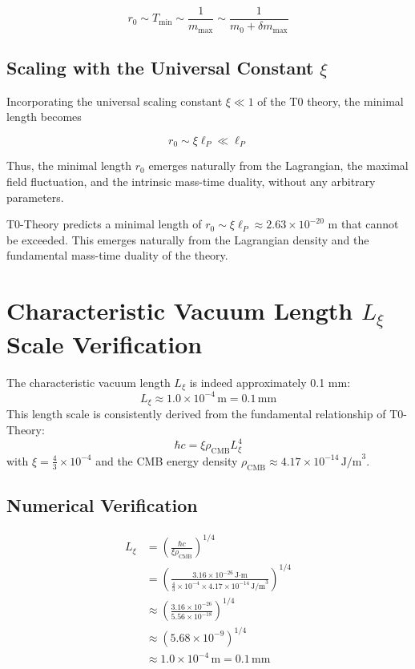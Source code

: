 \documentclass[12pt,a4paper]{article}
\numberwithin{equation}{section}
\begin{document}
	\begin{equation}
		r_0 \sim T_{\mathrm{min}} \sim \frac{1}{m_{\mathrm{max}}} \sim \frac{1}{m_0 + \delta m_{\mathrm{max}}}
	\end{equation}
	
	\subsection{Scaling with the Universal Constant $\xi$}
	
	Incorporating the universal scaling constant $\xi \ll 1$ of the T0 theory, the minimal length becomes
	
	\begin{equation}
		r_0 \sim \xi \ell_P \ll \ell_P
	\end{equation}
	
	Thus, the minimal length $r_0$ emerges naturally from the Lagrangian, the maximal field fluctuation, and the intrinsic mass-time duality, without any arbitrary parameters.
\begin{revolutionary}
	T0-Theory predicts a minimal length of $r_0 \sim \xi \ell_P \approx 2.63 \times 10^{-20}$ m that cannot be exceeded. This emerges naturally from the Lagrangian density and the fundamental mass-time duality of the theory.
\end{revolutionary}
	\section*{Characteristic Vacuum Length $L_\xi$ Scale Verification}
	
	\begin{important}
		The characteristic vacuum length $L_\xi$ is indeed approximately 0.1 mm:
		\[
		L_\xi \approx 1.0 \times 10^{-4}\,\text{m} = 0.1\,\text{mm}
		\]
		This length scale is consistently derived from the fundamental relationship of T0-Theory:
		\[
		\hbar c = \xi \rho_{\text{CMB}} L_\xi^4
		\]
		with $\xi = \frac{4}{3} \times 10^{-4}$ and the CMB energy density $\rho_{\text{CMB}} \approx 4.17 \times 10^{-14}\,\text{J/m}^3$.
	\end{important}
	
	\subsection*{Numerical Verification}
	
	\begin{align*}
		L_\xi &= \left(\frac{\hbar c}{\xi \rho_{\text{CMB}}}\right)^{1/4} \\
		&= \left(\frac{3.16 \times 10^{-26}\,\text{J·m}}{\frac{4}{3} \times 10^{-4} \times 4.17 \times 10^{-14}\,\text{J/m}^3}\right)^{1/4} \\
		&\approx \left(\frac{3.16 \times 10^{-26}}{5.56 \times 10^{-18}}\right)^{1/4} \\
		&\approx \left(5.68 \times 10^{-9}\right)^{1/4} \\
		&\approx 1.0 \times 10^{-4}\,\text{m} = 0.1\,\text{mm}
	\end{align*}
	
\end{document}

